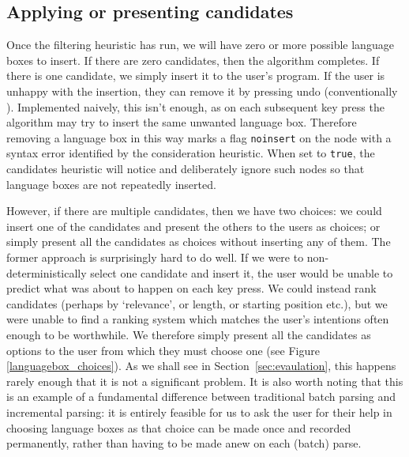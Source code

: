 \documentclass[sigplan,screen]{acmart}\settopmatter{printfolios=true,printccs=false,printacmref=false}
\begin{document}
\subsection{Applying or presenting candidates}

Once the filtering heuristic has run, we will have zero or more possible
language boxes to insert. If there are zero candidates, then the algorithm
completes. If there is one candidate, we simply insert it to the user's
program. If the user is unhappy with the insertion, they can remove it by
pressing undo (conventionally ). Implemented naively, this isn't
enough, as on each subsequent key press the algorithm may try to insert the
same unwanted language box. Therefore removing a language box in this way marks
a flag \texttt{noinsert} on the node with a syntax error identified by the
consideration heuristic. When set to \texttt{true}, the candidates heuristic
will notice and deliberately ignore such nodes so that language boxes are not
repeatedly inserted.

However, if there are multiple candidates, then we have two choices: we could
insert one of the candidates and present the others to the users as choices; or
simply present all the candidates as choices without inserting
any of them. The former approach is surprisingly hard to do well. If we were to
non-deterministically select one candidate and insert it, the user would be
unable to predict what was about to happen on each key press. We could instead
rank candidates (perhaps by `relevance', or length, or starting position etc.),
but we were unable to find a ranking system which matches the user's intentions
often enough to be worthwhile. We therefore simply present all the candidates
as options to the user from which they must choose one (see Figure \ref{languagebox_choices}). As we shall see in
Section~\ref{sec:evaulation}, this happens rarely enough that it is not a
significant problem. It is also worth noting that this is an
example of a fundamental difference between traditional batch parsing and
incremental parsing: it is entirely feasible for us
to ask the user for their help in choosing language boxes as that choice can
be made once and recorded permanently, rather than having to be made anew
on each (batch) parse.
\end{document}
